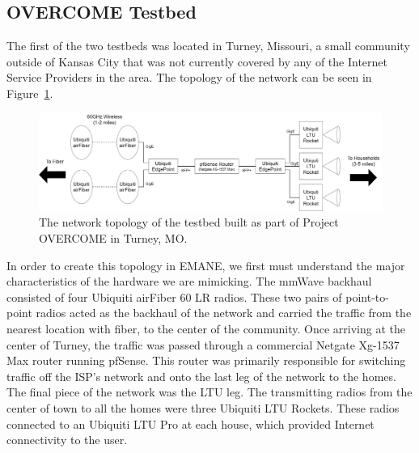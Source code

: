 \subsection{OVERCOME Testbed}
The first of the two testbeds was located in Turney, Missouri, a small community outside of Kansas City that was not currently covered by any of the Internet Service Providers in the area.
The topology of the network can be seen in Figure~\ref{overcome_topology}.
\begin{figure}[!ht]
    \centering
    \includegraphics[width=\textwidth,keepaspectratio]{Images/Chpt3/OVERCOME_Topology.png}
    \caption{The network topology of the testbed built as part of Project OVERCOME in Turney, MO.}
    \label{overcome_topology}
\end{figure}
In order to create this topology in EMANE, we first must understand the major characteristics of the hardware we are mimicking.
The mmWave backhaul consisted of four Ubiquiti airFiber 60 LR radios.
These two pairs of point-to-point radios acted as the backhaul of the network and carried the traffic from the nearest location with fiber, to the center of the community.
Once arriving at the center of Turney, the traffic was passed through a commercial Netgate Xg-1537 Max router running pfSense.
This router was primarily responsible for switching traffic off the ISP's network and onto the last leg of the network to the homes.
The final piece of the network was the LTU leg.
The transmitting radios from the center of town to all the homes were three Ubiquiti LTU Rockets.
These radios connected to an Ubiquiti LTU Pro at each house, which provided Internet connectivity to the user. 

